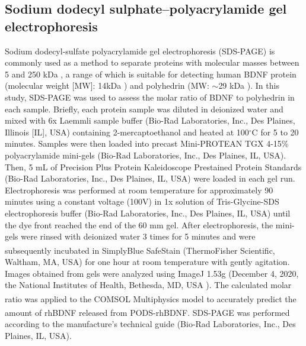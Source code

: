 \documentclass[review]{elsarticle}
\begin{document}
\subsection{Sodium dodecyl sulphate–polyacrylamide gel electrophoresis} 
Sodium dodecyl-sulfate polyacrylamide gel electrophoresis (SDS-PAGE) is commonly used as a method to separate proteins with molecular masses between 5 and 250 kDa  \cite{Laemmli1970}, a range of which is suitable for detecting human BDNF protein (molecular weight [MW]: 14kDa \cite {Mandel2009}) and polyhedrin (MW: $\sim$29 kDa \cite{Guo2017}). In this study, SDS-PAGE was used to assess the molar ratio of BDNF to polyhedrin in each sample.  Briefly, each protein sample was diluted in deionized water and mixed with 6x Laemmli sample buffer (Bio-Rad Laboratories, Inc., Des Plaines, Illinois [IL], USA) containing 2-mercaptoethanol and heated at 100$^\circ$C for 5 to 20 minutes. Samples were then loaded into precast Mini-PROTEAN TGX 4-15\% polyacrylamide mini-gels (Bio-Rad Laboratories, Inc., Des Plaines, IL, USA). Then, 5 mL of Precision Plus Protein Kaleidoscope Prestained Protein Standards (Bio-Rad Laboratories, Inc., Des Plaines, IL, USA) were loaded in each gel run. Electrophoresis was performed at room temperature for approximately 90 minutes using a constant voltage (100V) in 1x solution of Tris-Glycine-SDS electrophoresis buffer (Bio-Rad Laboratories, Inc., Des Plaines, IL, USA) until the dye front reached the end of the 60 mm gel. After electrophoresis, the mini-gels were rinsed with deionized water 3 times for 5 minutes and were subsequently incubated in SimplyBlue\textsuperscript{\texttrademark} SafeStain (ThermoFisher Scientific, Waltham, MA, USA) for one hour at room temperature with gently agitation. Images obtained from gels were analyzed using ImageJ 1.53g (December 4, 2020, the National Institutes of Health, Bethesda, MD, USA \cite{Schneider2012}). The calculated molar ratio was applied to the COMSOL\textsuperscript{\textregistered} Multiphysics model to accurately predict the amount of rhBDNF released from PODS\textsuperscript{\textregistered}-rhBDNF. SDS-PAGE was performed according to the manufacture's technical guide (Bio-Rad Laboratories, Inc., Des Plaines, IL, USA). 
\end{document}

